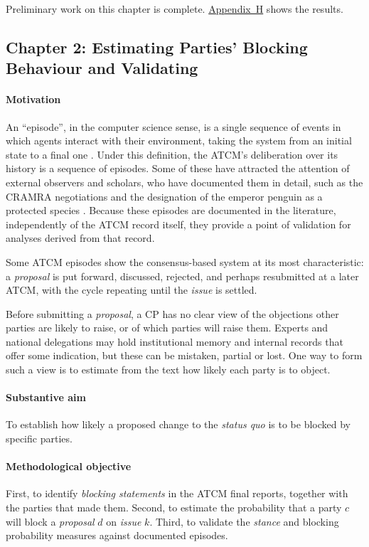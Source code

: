 Preliminary work on this chapter is complete. \hyperref[app:h]{Appendix~H} shows the results.

\subsection{Chapter 2: Estimating Parties' Blocking Behaviour and Validating}
\label{sec:ch2}

\paragraph{Motivation}
An ``episode'', in the computer science sense, is a single sequence of events in which agents
interact with their environment, taking the system from an initial state to a final one
\parencite[Section~3.3]{Sutton2018}. Under
this definition, the ATCM's deliberation over its history is a sequence of episodes. Some of
these have attracted the attention of external observers and scholars, who have documented them
in detail, such as the CRAMRA negotiations \parencite{jackson2021antarctica} and the designation
of the emperor penguin as a protected species
\parencite{Kubny2022,Cahill2026}. Because these episodes are
documented in the literature, independently of the ATCM record itself, they provide a point of
validation for analyses derived from that record.

Some ATCM episodes show the consensus-based system at its most characteristic: a
\textit{proposal} is put forward, discussed, rejected, and perhaps resubmitted at a later ATCM,
with the cycle repeating until the \textit{issue} is settled.

Before submitting a \textit{proposal}, a CP has no clear view of the objections other parties are
likely to raise, or of which parties will raise them. Experts and national delegations may hold
institutional memory and internal records that offer some indication, but these can be mistaken,
partial or lost. One way to form such a view is to estimate from the text how likely each party is to object.

\paragraph{Substantive aim}
To establish how likely a proposed change to the \textit{status quo} is to be blocked by specific
parties.

\paragraph{Methodological objective}
First, to identify \textit{blocking statements} in the ATCM final reports, together with the
parties that made them. Second, to estimate the probability that a party $c$ will block a
\textit{proposal} $d$ on \textit{issue} $k$. Third, to validate the \textit{stance} and blocking
probability measures against documented episodes.

